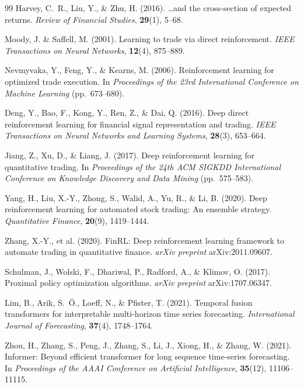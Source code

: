 \documentclass[10pt,leqno]{amsart}
\begin{document}
\begin{thebibliography}{99}
 Harvey, C.~R., Liu, Y., \& Zhu, H. (2016). \dots and the cross-section of expected returns. \textit{Review of Financial Studies}, \textbf{29}(1), 5--68.

 Moody, J. \& Saffell, M. (2001). Learning to trade via direct reinforcement. \textit{IEEE Transactions on Neural Networks}, \textbf{12}(4), 875--889.

 Nevmyvaka, Y., Feng, Y., \& Kearns, M. (2006). Reinforcement learning for optimized trade execution. In \textit{Proceedings of the 23rd International Conference on Machine Learning} (pp.~673--680).

 Deng, Y., Bao, F., Kong, Y., Ren, Z., \& Dai, Q. (2016). Deep direct reinforcement learning for financial signal representation and trading. \textit{IEEE Transactions on Neural Networks and Learning Systems}, \textbf{28}(3), 653--664.

 Jiang, Z., Xu, D., \& Liang, J. (2017). Deep reinforcement learning for quantitative trading. In \textit{Proceedings of the 24th ACM SIGKDD International Conference on Knowledge Discovery and Data Mining} (pp.~575--583).

 Yang, H., Liu, X.-Y., Zhong, S., Walid, A., Yu, R., \& Li, B. (2020). Deep reinforcement learning for automated stock trading: An ensemble strategy. \textit{Quantitative Finance}, \textbf{20}(9), 1419--1444.

 Zhang, X.-Y., et al. (2020). FinRL: Deep reinforcement learning framework to automate trading in quantitative finance. \textit{arXiv preprint} arXiv:2011.09607.

 Schulman, J., Wolski, F., Dhariwal, P., Radford, A., \& Klimov, O. (2017). Proximal policy optimization algorithms. \textit{arXiv preprint} arXiv:1707.06347.

 Lim, B., Arik, S.~{\"O}., Loeff, N., \& Pfister, T. (2021). Temporal fusion transformers for interpretable multi-horizon time series forecasting. \textit{International Journal of Forecasting}, \textbf{37}(4), 1748--1764.

 Zhou, H., Zhang, S., Peng, J., Zhang, S., Li, J., Xiong, H., \& Zhang, W. (2021). Informer: Beyond efficient transformer for long sequence time-series forecasting. In \textit{Proceedings of the AAAI Conference on Artificial Intelligence}, \textbf{35}(12), 11106--11115.


\end{thebibliography}
\end{document}
